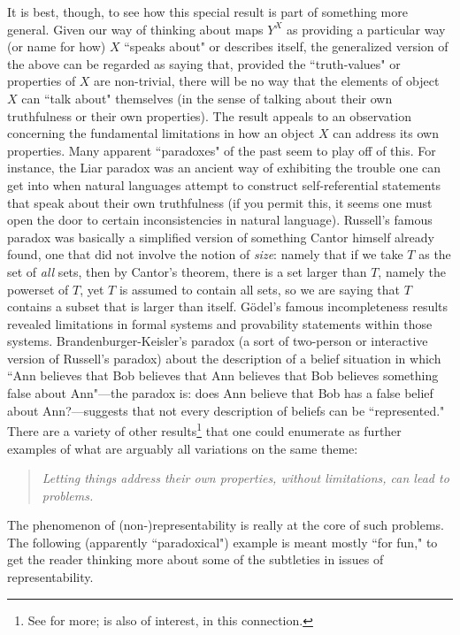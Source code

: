\documentclass[11pt]{book}
\theoremstyle{definition}
\theoremstyle{definition}
\theoremstyle{definition}
\theoremstyle{theorem}
\theoremstyle{definition}
\begin{document}
It is best, though, to see how this special result is part of something more general. Given our way of thinking about maps $Y^X$ as providing a particular way (or name for how) $X$ ``speaks about" or describes itself, the generalized version of the above can be regarded as saying that, provided the ``truth-values" or properties of $X$ are non-trivial, there will be no way that the elements of object $X$ can ``talk about" themselves (in the sense of talking about their own truthfulness or their own properties). The result appeals to an observation concerning the fundamental limitations in how an object $X$ can address its own properties. Many apparent ``paradoxes" of the past seem to play off of this. For instance, the Liar paradox was an ancient way of exhibiting the trouble one can get into when natural languages attempt to construct self-referential statements that speak about their own truthfulness (if you permit this, it seems one must open the door to certain inconsistencies in natural language). Russell's famous paradox was basically a simplified version of something Cantor himself already found, one that did not involve the notion of \textit{size}: namely that if we take $T$ as the set of \textit{all} sets, then by Cantor's theorem, there is a set larger than $T$, namely the powerset of $T$, yet $T$ is assumed to contain all sets, so we are saying that $T$ contains a subset that is larger than itself. G\"{o}del's famous incompleteness results revealed limitations in formal systems and provability statements within those systems. Brandenburger-Keisler's paradox (a sort of two-person or interactive version of Russell's paradox) about the description of a belief situation in which ``Ann believes that Bob believes that Ann believes that Bob believes something false about Ann"---the paradox is: does Ann believe that Bob has a false belief about Ann?---suggests that not every description of beliefs can be ``represented." There are a variety of other results\footnote{See \cite{yanofsky_universal_2003} for more; \cite{abramsky_contextual_2014} is also of interest, in this connection.} that one could enumerate as further examples of what are arguably all variations on the same theme: 
\begin{quote}
	\textit{Letting things address their own properties, without limitations, can lead to problems.} 
\end{quote}    
The phenomenon of (non-)representability is really at the core of such problems. The following (apparently ``paradoxical") example is meant mostly ``for fun," to get the reader thinking more about some of the subtleties in issues of representability.  
\end{document}
